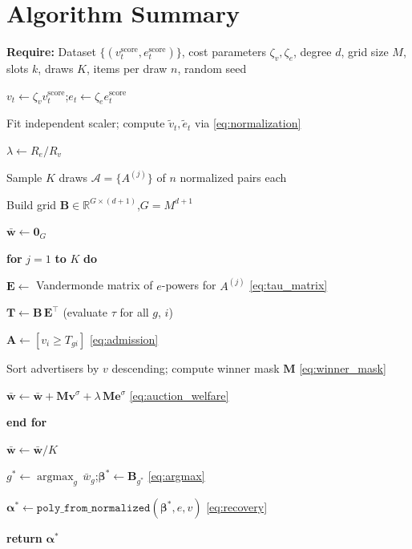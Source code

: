 \documentclass[11pt]{article}
\newcommand{\bsbeta}{\boldsymbol{\beta}}
\begin{document}
\section{Algorithm Summary}

\begin{algorithm}[H]
\caption{Grid Search for Optimal Tau}
\noindent\textbf{Require:} Dataset $\{(v_t^{\text{score}}, e_t^{\text{score}})\}$, cost parameters
$\zeta_v, \zeta_e$, degree $d$, grid size $M$, slots $k$, draws $K$,
items per draw $n$, random seed
\begin{description}
\setlength{\itemsep}{1pt}\setlength{\parsep}{0pt}
\item[\normalfont 1:]  $v_t \gets \zeta_v v_t^{\text{score}}$;\quad $e_t \gets \zeta_e e_t^{\text{score}}$
\item[\normalfont 2:]  Fit independent scaler; compute $\tilde{v}_t, \tilde{e}_t$ via \eqref{eq:normalization}
\item[\normalfont 3:]  $\lambda \gets R_e / R_v$
\item[\normalfont 4:]  Sample $K$ draws $\mathcal{A} = \{A^{(j)}\}$ of $n$ normalized pairs each
\item[\normalfont 5:]  Build grid $\mathbf{B} \in \mathbb{R}^{G \times (d+1)}$,\quad $G = M^{d+1}$
\item[\normalfont 6:]  $\bar{\mathbf{w}} \gets \mathbf{0}_G$
\item[\normalfont 7:]  \textbf{for} $j = 1$ \textbf{to} $K$ \textbf{do}
\item[\normalfont 8:]  \hspace{1.5em}$\mathbf{E} \gets$ Vandermonde matrix of $e$-powers for $A^{(j)}$ \hfill \eqref{eq:tau_matrix}
\item[\normalfont 9:]  \hspace{1.5em}$\mathbf{T} \gets \mathbf{B}\,\mathbf{E}^\top$ \hfill (evaluate $\tau$ for all $g$, $i$)
\item[\normalfont 10:] \hspace{1.5em}$\mathbf{A} \gets [v_i \geq T_{gi}]$ \hfill \eqref{eq:admission}
\item[\normalfont 11:] \hspace{1.5em}Sort advertisers by $v$ descending; compute winner mask $\mathbf{M}$ \hfill \eqref{eq:winner_mask}
\item[\normalfont 12:] \hspace{1.5em}$\bar{\mathbf{w}} \gets \bar{\mathbf{w}} + \mathbf{M}\mathbf{v}^\sigma + \lambda\,\mathbf{M}\mathbf{e}^\sigma$ \hfill \eqref{eq:auction_welfare}
\item[\normalfont 13:] \textbf{end for}
\item[\normalfont 14:] $\bar{\mathbf{w}} \gets \bar{\mathbf{w}} / K$
\item[\normalfont 15:] $g^* \gets \operatorname{argmax}_g\, \bar{w}_g$;\quad $\bsbeta^* \gets \mathbf{B}_{g^*}$ \hfill \eqref{eq:argmax}
\item[\normalfont 16:] $\boldsymbol{\alpha}^* \gets \texttt{poly\_from\_normalized}(\bsbeta^*, e, v)$ \hfill \eqref{eq:recovery}
\item[\normalfont 17:] \textbf{return} $\boldsymbol{\alpha}^*$
\end{description}
\end{algorithm}
\end{document}
